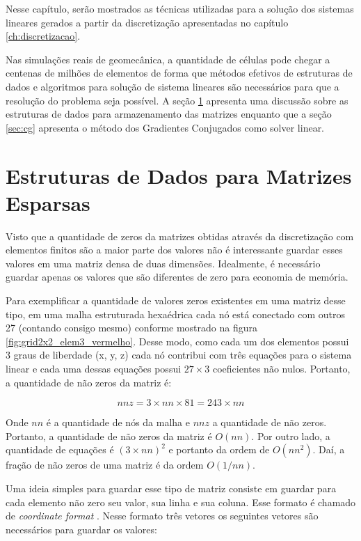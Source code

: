 

Nesse capítulo, serão mostrados as técnicas utilizadas para a solução dos sistemas lineares gerados a partir da discretização apresentadas no capítulo \ref{ch:discretizacao}.


Nas simulações reais de geomecânica, a quantidade de células pode chegar a centenas de milhões de elementos de forma que métodos efetivos de estruturas de dados e algoritmos para solução de sistema lineares são necessários para que a resolução do problema seja possível. A seção \ref{sec:csr} apresenta uma discussão sobre as estruturas de dados para armazenamento das matrizes enquanto que a seção \ref{sec:cg} apresenta o método dos Gradientes Conjugados como solver linear.


\section{Estruturas de Dados para Matrizes Esparsas} \label{sec:csr}


Visto que a quantidade de zeros da matrizes obtidas através da discretização com elementos finitos são a maior parte dos valores não é interessante guardar esses valores em uma matriz densa de duas dimensões. Idealmente, é necessário guardar apenas os valores que são diferentes de zero para economia de memória.

Para exemplificar a quantidade de valores zeros existentes em uma matriz desse tipo, em uma malha estruturada hexaédrica cada nó está conectado com outros 27 (contando consigo mesmo) conforme mostrado na figura \ref{fig:grid2x2_elem3_vermelho}. Desse modo, como cada um dos elementos possui 3 graus de liberdade (x, y, z) cada nó contribui com três equações para o sistema linear e cada uma dessas equações possui $27\times3$ coeficientes não nulos.
Portanto, a quantidade de não zeros da matriz é:

\begin{equation}
    nnz = 3 \times nn \times 81 = 243 \times nn
\end{equation}

Onde $nn$ é a quantidade de nós da malha e $nnz$ a quantidade de não zeros. Portanto, a quantidade de não zeros da matriz é $O(nn)$. Por outro lado, a quantidade de equações é $(3\times nn)^2 $ e portanto da ordem de $O(nn^2)$. Daí, a fração de não zeros de uma matriz é da ordem $O(1/nn)$.


Uma ideia simples para guardar esse tipo de matriz consiste em guardar para cada elemento não zero seu valor, sua linha e sua coluna. Esse formato é chamado de \textit{coordinate format} \cite{solverlinear}. Nesse formato três vetores os seguintes vetores são necessários para guardar os valores:

